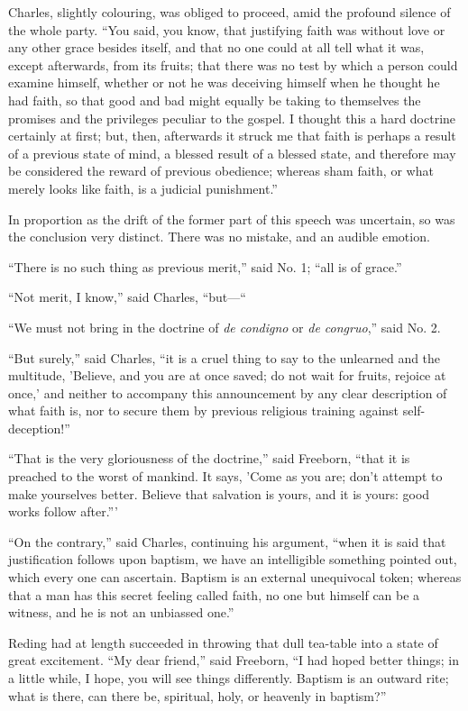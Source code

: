 Charles, slightly colouring, was obliged to proceed, amid the
profound silence of the whole party. ``You said, you know, that
justifying faith was without love or any other grace besides itself,
and that no one could at all tell what it was, except afterwards, from
its fruits; that there was no test by which a person could examine
himself, whether or not he was deceiving himself when he thought he
had faith, so that good and bad might equally be taking to themselves
the promises and the privileges peculiar to the gospel. I thought this
a hard doctrine certainly at first; but, then, afterwards it struck me
that faith is perhaps a result of a previous state of mind, a blessed
result of a blessed state, and therefore may be considered the reward
of previous obedience; whereas sham faith, or what merely looks like
faith, is a judicial punishment.''

In proportion as the drift of the former part of this speech was
uncertain, so was the conclusion very distinct. There was no mistake,
and an audible emotion.

``There is no such thing as previous merit,'' said No. 1;
``all is of grace.''

``Not merit, I know,'' said Charles, ``but—``

``We must not bring in the doctrine of \emph{de condigno} or \emph{de
congruo},'' said No. 2.

``But surely,'' said Charles, ``it is a cruel thing to
say to the unlearned and the multitude, 'Believe, and you are at once
saved; do not wait for fruits, rejoice at once,' and neither to
accompany this announcement by any clear description of what faith is,
nor to secure them by previous religious training against
self-deception!''

``That is the very gloriousness of the doctrine,'' said
Freeborn, ``that it is preached to the worst of mankind. It says,
'Come as you are; don't attempt to make yourselves better. Believe
that salvation is yours, and it is yours: good works follow
after.'''

``On the contrary,'' said Charles, continuing his argument,
``when it is said that justification follows upon baptism, we have
an intelligible something pointed out, which every one can ascertain.
Baptism is an external unequivocal token; whereas that a man has this
secret feeling called faith, no one but himself can be a witness, and
he is not an unbiassed one.''

Reding had at length succeeded in throwing that dull tea-table into
a state of great excitement. ``My dear friend,'' said
Freeborn, ``I had hoped better things; in a little while, I hope,
you will see things differently. Baptism is an outward rite; what is
there, can there be, spiritual, holy, or heavenly in baptism?''

